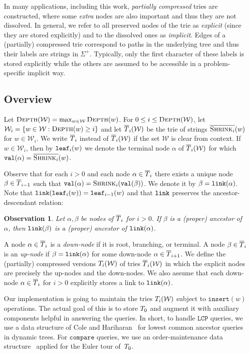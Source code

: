 \documentclass[a4paper]{article}
\newtheorem{observation}[theorem]{Observation}
\theoremstyle{remark}
\newcommand{\compop}{\mathtt{compare}}
\newcommand{\lcpop}{\mathtt{LCP}}
\newcommand{\depth}{\textsc{Depth}}
\newcommand{\shrink}[1]{\ensuremath{\textsc{Shrink}_{#1}}}
\newcommand{\cshrink}[1]{\ensuremath{\overline{\textsc{Shrink}_{#1}}}}
\newcommand{\coll}{\mathcal{W}}
\newcommand{\insertop}{\mathtt{insert}}
\begin{document}
In many applications, including this work, \emph{partially compressed} tries are constructed,
where some \emph{extra} nodes are also important and thus they are not dissolved.
In general, we refer to all preserved nodes of the trie as \emph{explicit} (since they are stored explicitly)
and to the dissolved ones as \emph{implicit}.
Edges of a (partially) compressed trie correspond to paths in the underlying tree
and thus their labels are strings in $\Sigma^+$. Typically, only the first character of these labels is stored explicitly
while the others are assumed to be accessible in a problem-specific implicit way.

\subsection{Overview}
Let $\depth(\coll)=\max_{w\in \coll} \depth(w)$. For $0\le i \le \depth(\coll)$, let $\coll_i = \{w \in \coll : \depth(w)\ge i\}$
and let $\utrie_i(\coll)$ be the trie of strings $\cshrink{i}(w)$ for $w\in \coll_i$.
We write $\overline{T}_i$ instead of $\utrie_i(\coll)$ if the set $\coll$ is clear from context.
If $w\in \coll_i$, then by $\mathtt{leaf}_i(w)$ we denote the terminal node $\alpha$ of $\utrie_i(\coll)$ for which
$\tval(\alpha)=\cshrink{i}(w)$.

Observe that for each $i>0$ and each node $\alpha\in \overline{T}_i$ there exists a unique node $\beta\in \overline{T}_{i-1}$
such that $\tval(\alpha)=\shrink{i}(\tval(\beta))$. We denote it by $\beta = \mathtt{link}(\alpha)$.
Note that $\mathtt{link}(\mathtt{leaf}_i(w))=\mathtt{leaf}_{i-1}(w)$ and that $\mathtt{link}$ preserves the ancestor-descendant relation:

\begin{observation}\label{obs:link}
Let $\alpha,\beta$ be nodes of $\overline{T}_i$ for $i>0$. If $\beta$ is a (proper) ancestor of $\alpha$, then $\mathtt{link}(\beta)$
is a (proper) ancestor of $\mathtt{link}(\alpha)$.
\end{observation}

A node $\alpha\in \overline{T}_i$ is a \emph{down-node} if it is root, branching, or terminal.
A node $\beta\in \overline{T}_{i}$ is an \emph{up-node} if $\beta=\mathtt{link}(\alpha)$ for some down-node
$\alpha\in \overline{T}_{i+1}$.
We define the (partially) compressed versions $\trie_i(\coll)$ of tries $\utrie_i(\coll)$ in which the explicit
nodes are precisely the up-nodes and the down-nodes. We also assume that each down-node $\alpha\in \overline{T}_{i}$
for $i>0$ explicitly stores a link to $\mathtt{link}(\alpha)$.

Our implementation is going to maintain the tries $\trie_i(\coll)$ subject to $\insertop(w)$  operations.
The actual goal of this is to store $T_0$ and augment it with auxiliary components helpful in answering the queries.
In short, to handle $\lcpop$ queries, we use a data structure of Cole and Hariharan~\cite{Cole:2005} for
lowest common ancestor queries in dynamic trees.
For $\compop$ queries, we use an order-maintenance data structure~\cite{Dietz:1987,Bender:2002}
applied for the Euler tour of~$T_0$.
\end{document}
